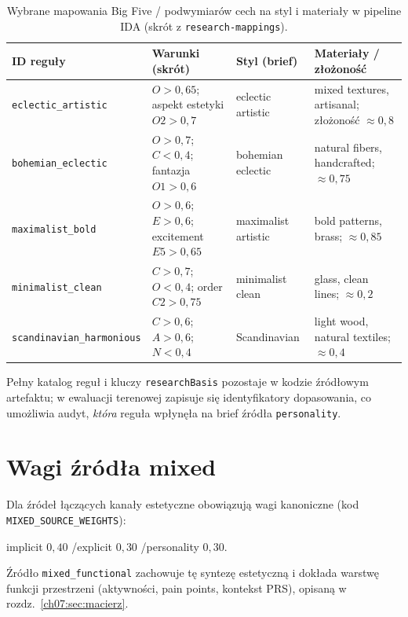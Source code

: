 \begin{table}[htbp]
  \centering
  \caption{Wybrane mapowania Big Five / podwymiarów cech na styl i materiały w pipeline IDA (skrót z \texttt{research-mappings}).}
  \label{tab:app:c:mappings}
  \begin{tabular}{@{}p{}p{}p{}p{}@{}}
    \toprule
    ID reguły & Warunki (skrót) & Styl (brief) & Materiały / złożoność \\
    \midrule
    \texttt{eclectic\_artistic} &
    $O>0{,}65$; aspekt estetyki $O2>0{,}7$ &
    eclectic artistic &
    mixed textures, artisanal; złożoność $\approx 0{,}8$ \\
    \addlinespace
    \texttt{bohemian\_eclectic} &
    $O>0{,}7$; $C<0{,}4$; fantazja $O1>0{,}6$ &
    bohemian eclectic &
    natural fibers, handcrafted; $\approx 0{,}75$ \\
    \addlinespace
    \texttt{maximalist\_bold} &
    $O>0{,}6$; $E>0{,}6$; excitement $E5>0{,}65$ &
    maximalist artistic &
    bold patterns, brass; $\approx 0{,}85$ \\
    \addlinespace
    \texttt{minimalist\_clean} &
    $C>0{,}7$; $O<0{,}4$; order $C2>0{,}75$ &
    minimalist clean &
    glass, clean lines; $\approx 0{,}2$ \\
    \addlinespace
    \texttt{scandinavian\_harmonious} &
    $C>0{,}6$; $A>0{,}6$; $N<0{,}4$ &
    Scandinavian &
    light wood, natural textiles; $\approx 0{,}4$ \\
    \bottomrule
  \end{tabular}
\end{table}

Pełny katalog reguł i kluczy \texttt{researchBasis} pozostaje w kodzie źródłowym artefaktu; w ewaluacji terenowej zapisuje się identyfikatory dopasowania, co umożliwia audyt, \emph{która} reguła wpłynęła na brief źródła \texttt{personality}.

\section{Wagi źródła mixed}
\label{app:c:sec:wagi}

Dla źródeł łączących kanały estetyczne obowiązują wagi kanoniczne (kod \texttt{MIXED\_SOURCE\_WEIGHTS}):

\begin{center}
implicit $0{,}40$ \quad/\quad explicit $0{,}30$ \quad/\quad personality $0{,}30$.
\end{center}

Źródło \texttt{mixed\_functional} zachowuje tę syntezę estetyczną i dokłada warstwę funkcji przestrzeni (aktywności, pain points, kontekst PRS), opisaną w rozdz.~\ref{ch07:sec:macierz}.
